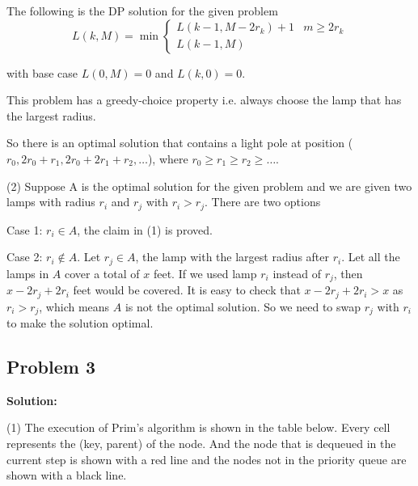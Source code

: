 \documentclass[12pt,a4paper]{article}
\newcommand{\solution}{\noindent\textbf{Solution:}\\\indent}
\begin{document}
The following is the DP solution for the given problem
\begin{equation*}
    L(k,M) = \min\begin{cases}
        L(k-1, M-2r_k) + 1 & m \geq 2r_k \\
        L(k-1, M) & 
    \end{cases}
\end{equation*}

with base case $L(0,M) = 0$ and $L(k,0) = 0$.

This problem has a greedy-choice property i.e. always choose the lamp that has the largest radius.

So there is an optimal solution that contains a light pole at position ($r_0, 2r_0 + r_1, 2r_0 + 2r_1 + r_2, \hdots$), where $r_0 \geq r_1 \geq r_2 \geq \hdots$.

(2) Suppose A is the optimal solution for the given problem and we are given two lamps with radius $r_i$ and $r_j$ with $r_i > r_j$. There are two options

Case 1: $r_i \in A$, the claim in (1) is proved.

Case 2: $r_i \not\in A$. Let $r_j \in A$, the lamp with the largest radius after $r_i$. Let all the lamps in $A$ cover a total of $x$ feet. If we used lamp $r_i$ instead of $r_j$, then $x-2r_j+2r_i$ feet would be covered. It is easy to check that $x-2r_j+2r_i > x$ as $r_i > r_j$, which means $A$ is not the optimal solution. So we need to swap $r_j$ with $r_i$ to make the solution optimal.

\newpage
\subsection*{Problem 3}
\solution

(1) The execution of Prim's algorithm is shown in the table below. Every cell represents the (key, parent) of the node. And the node that is dequeued in the current step is shown with a red line and the nodes not in the priority queue are shown with a black line. \\
\end{document}
